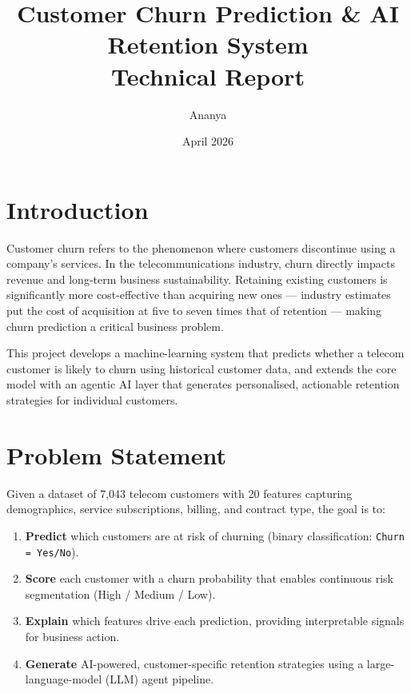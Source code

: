 \documentclass[12pt]{article}
\title{\textbf{Customer Churn Prediction \& AI Retention System} \\
       \large Technical Report}
\author{Ananya}
\date{April 2026}
\begin{document}
\maketitle
\newpage
\tableofcontents
\newpage

\section{Introduction}

Customer churn refers to the phenomenon where customers discontinue using a
company's services. In the telecommunications industry, churn directly
impacts revenue and long-term business sustainability. Retaining existing
customers is significantly more cost-effective than acquiring new ones —
industry estimates put the cost of acquisition at five to seven times that
of retention — making churn prediction a critical business problem.

This project develops a machine-learning system that predicts whether a
telecom customer is likely to churn using historical customer data, and
extends the core model with an agentic AI layer that generates
personalised, actionable retention strategies for individual customers.

\section{Problem Statement}

Given a dataset of 7,043 telecom customers with 20 features capturing
demographics, service subscriptions, billing, and contract type, the goal
is to:

\begin{enumerate}
  \item \textbf{Predict} which customers are at risk of churning (binary
        classification: \texttt{Churn = Yes/No}).
  \item \textbf{Score} each customer with a churn probability that enables
        continuous risk segmentation (High / Medium / Low).
  \item \textbf{Explain} which features drive each prediction, providing
        interpretable signals for business action.
  \item \textbf{Generate} AI-powered, customer-specific retention strategies
        using a large-language-model (LLM) agent pipeline.
\end{enumerate}
\end{document}
